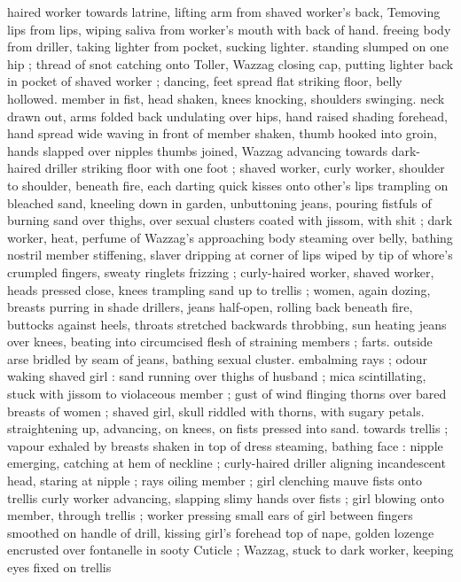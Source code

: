 haired worker towards latrine, lifting arm from shaved worker's back, 
Temoving lips from lips, wiping saliva from worker's mouth with back 
of hand. freeing body from driller, taking lighter from pocket, sucking 
lighter. standing slumped on one hip ; thread of snot catching onto 
Toller, Wazzag closing cap, putting lighter back in pocket of shaved 
worker ; dancing, feet spread flat striking floor, belly hollowed. 
member in fist, head shaken, knees knocking, shoulders swinging. 
neck drawn out, arms folded back undulating over hips, hand raised 
shading forehead, hand spread wide waving in front of member 
shaken, thumb hooked into groin, hands slapped over nipples 
thumbs joined, Wazzag advancing towards dark-haired driller striking 
floor with one foot ; shaved worker, curly worker, shoulder to 
shoulder, beneath fire, each darting quick kisses onto other's lips 
trampling on bleached sand, kneeling down in garden, unbuttoning 
jeans, pouring fistfuls of burning sand over thighs, over sexual 
clusters coated with jissom, with shit ; dark worker, heat, perfume of 
Wazzag's approaching body steaming over belly, bathing nostril 
member stiffening, slaver dripping at corner of lips wiped by tip of 
whore's crumpled fingers, sweaty ringlets frizzing ; curly-haired 
worker, shaved worker, heads pressed close, knees trampling sand 
up to trellis ; women, again dozing, breasts purring in shade 
drillers, jeans half-open, rolling back beneath fire, buttocks against 
heels, throats stretched backwards throbbing, sun heating jeans over 
knees, beating into circumcised flesh of straining members ; farts. 
outside arse bridled by seam of jeans, bathing sexual cluster. 
embalming rays ; odour waking shaved girl : sand running over 
thighs of husband ; mica scintillating, stuck with jissom to violaceous 
member ; gust of wind flinging thorns over bared breasts of women 
; shaved girl, skull riddled with thorns, with sugary petals. 
straightening up, advancing, on knees, on fists pressed into sand. 
towards trellis ; vapour exhaled by breasts shaken in top of dress 
steaming, bathing face : nipple emerging, catching at hem of 
neckline ; curly-haired driller aligning incandescent head, staring at 
nipple ; rays oiling member ; girl clenching mauve fists onto trellis 
curly worker advancing, slapping slimy hands over fists ; girl blowing 
onto member, through trellis ; worker pressing small ears of girl 
between fingers smoothed on handle of drill, kissing girl's forehead 
top of nape, golden lozenge encrusted over fontanelle in sooty 
Cuticle ; Wazzag, stuck to dark worker, keeping eyes fixed on trellis 
